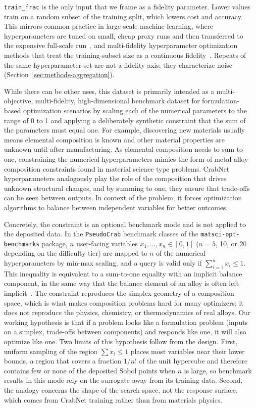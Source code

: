 \documentclass[pdflatex,sn-mathphys-num]{sn-jnl}
\begin{document}
\texttt{train\_frac} is the only input that we frame as a fidelity parameter. Lower values train on a random subset of the training split, which lowers cost and accuracy. This mirrors common practice in large-scale machine learning, where hyperparameters are tuned on small, cheap proxy runs and then transferred to the expensive full-scale run~\cite{Yang2021_muP}, and multi-fidelity hyperparameter optimization methods that treat the training-subset size as a continuous fidelity~\cite{Klein2017_FABOLAS}. Repeats of the same hyperparameter set are not a fidelity axis; they characterize noise (Section~\ref{sec:methods-aggregation}).

While there can be other uses, this dataset is primarily intended as a multi-objective, multi-fidelity, high-dimensional benchmark dataset for formulation-based optimization scenarios by scaling each of the numerical parameters to the range of 0 to 1 and applying a deliberately synthetic constraint that the sum of the parameters must equal one. For example, discovering new materials usually means elemental composition is known and other material properties are unknown until after manufacturing. As elemental composition needs to sum to one, constraining the numerical hyperparameters mimics the form of metal alloy composition constraints found in material science type problems. CrabNet hyperparameters analogously play the role of the composition that drives unknown structural changes, and by summing to one, they ensure that trade-offs can be seen between outputs. In context of the problem, it forces optimization algorithms to balance between independent variables for better outcomes.

Concretely, the constraint is an optional benchmark mode and is not applied to the deposited data. In the \texttt{PseudoCrab} benchmark classes of the \texttt{matsci-opt-benchmarks} package, $n$ user-facing variables $x_1, \dots, x_n \in [0, 1]$ ($n = 5$, 10, or 20 depending on the difficulty tier) are mapped to $n$ of the numerical hyperparameters by min-max scaling, and a query is valid only if $\sum_{i=1}^{n} x_i \le 1$. This inequality is equivalent to a sum-to-one equality with an implicit balance component, in the same way that the balance element of an alloy is often left implicit~\cite{Existing07_09_Baird2023_Compactness}. The constraint reproduces the simplex geometry of a composition space, which is what makes composition problems hard for many optimizers; it does not reproduce the physics, chemistry, or thermodynamics of real alloys. Our working hypothesis is that if a problem looks like a formulation problem (inputs on a simplex, trade-offs between components) and responds like one, it will also optimize like one. Two limits of this hypothesis follow from the design. First, uniform sampling of the region $\sum x_i \le 1$ places most variables near their lower bounds, a region that covers a fraction $1/n!$ of the unit hypercube and therefore contains few or none of the deposited Sobol points when $n$ is large, so benchmark results in this mode rely on the surrogate away from its training data. Second, the analogy concerns the shape of the search space, not the response surface, which comes from CrabNet training rather than from materials physics.
\end{document}
